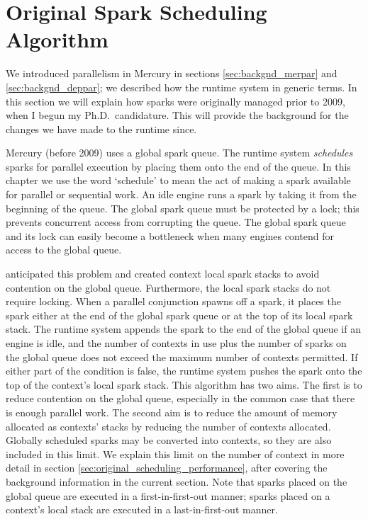 
\section{Original Spark Scheduling Algorithm}
\label{sec:original_scheduling}

We introduced parallelism in Mercury in sections \ref{sec:backgnd_merpar} and
\ref{sec:backgnd_deppar};
we described how the runtime system in generic terms.
In this section we will explain how sparks were originally managed
prior to 2009,
when I begun my Ph.D.\ candidature.
This will provide the background for the changes we have made to the
runtime since.

Mercury (before 2009) uses a global spark queue.
The runtime system \emph{schedules} sparks for parallel execution by placing
them onto the end of the queue.
In this chapter we use the word `schedule' to mean the act of making a spark
available for parallel or sequential work.
An idle engine runs a spark by taking it from the beginning of the queue.
The global spark queue must be protected by a lock;
this prevents concurrent access from corrupting the queue.
The global spark queue and its lock can easily become a bottleneck when many
engines contend for access to the global queue.

\citet{wang:2006:hons} anticipated this problem and created context local spark
stacks to avoid contention on the global queue.
Furthermore, the local spark stacks do not require locking.
When a parallel conjunction spawns off a spark,
it places the spark either at the end of the global spark queue or at the
top of its local spark stack.
The runtime system appends the spark to the end of the global queue if
an engine is idle, and
the number of contexts in use plus the number of sparks on the global queue
does not exceed the maximum number of contexts permitted.
If either part of the condition is false,
the runtime system pushes the spark onto the top of the context's local
spark stack.
This algorithm has two aims.
The first is to reduce contention on the global queue,
especially in the common case that there is enough parallel work.
The second aim is to reduce the amount of memory allocated
as contexts' stacks by reducing the number of contexts allocated.
Globally scheduled sparks may be converted into contexts,
so they are also included in this limit.
We explain this limit on the number of context in more detail
in section \ref{sec:original_scheduling_performance},
after covering the background information in the current section.
Note that sparks placed on the global queue are executed in a
first-in-first-out manner;
sparks placed on a context's local stack are executed in a
last-in-first-out manner.

